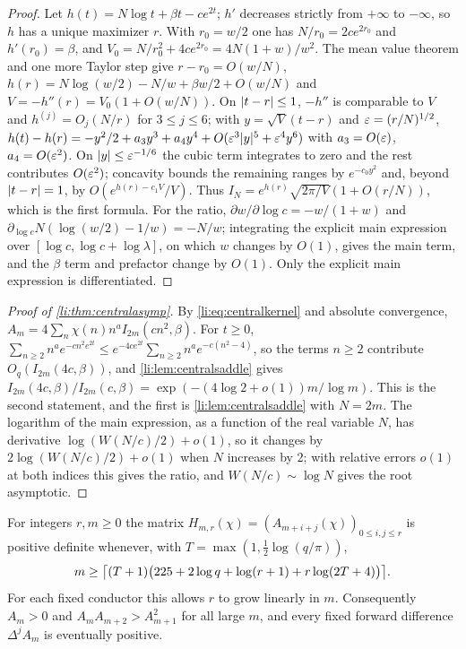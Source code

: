 \begin{proof}
Let $h(t)=N\log t+\beta t-ce^{2t}$; $h'$ decreases strictly from $+\infty$ to $-\infty$, so $h$ has a unique
maximizer $r$. With $r_0=w/2$ one has $N/r_0=2ce^{2r_0}$ and $h'(r_0)=\beta$, and
$V_0=N/r_0^2+4ce^{2r_0}=4N(1+w)/w^2$. The mean value theorem and one more Taylor step give
$r-r_0=O(w/N)$, $h(r)=N\log(w/2)-N/w+\beta w/2+O(w/N)$ and $V=-h''(r)=V_0(1+O(w/N))$. On $\abs{t-r}\le1$,
$-h''$ is comparable to $V$ and $h^{(j)}=O_j(N/r)$ for $3\le j\le6$; with $y=\sqrt V(t-r)$ and
$\eps=(r/N)^{1/2}$, $h(t)-h(r)=-y^2/2+a_3y^3+a_4y^4+O(\eps^3\abs y^5+\eps^4y^6)$ with $a_3=O(\eps)$,
$a_4=O(\eps^2)$. On $\abs y\le\eps^{-1/6}$ the cubic term integrates to zero and the rest contributes
$O(\eps^2)$; concavity bounds the remaining ranges by $e^{-c_0y^2}$ and, beyond $\abs{t-r}=1$, by
$O(e^{h(r)-c_1V}/V)$. Thus $I_N=e^{h(r)}\sqrt{2\pi/V}(1+O(r/N))$, which is the first formula. For the ratio,
$\partial w/\partial\log c=-w/(1+w)$ and $\partial_{\log c}N(\log(w/2)-1/w)=-N/w$; integrating the
explicit main expression over $[\log c,\log c+\log\lambda]$, on which $w$ changes by $O(1)$, gives the
main term, and the $\beta$ term and prefactor change by $O(1)$. Only the explicit main expression is
differentiated.
\end{proof}

\begin{proof}[Proof of \cref{li:thm:centralasymp}]
By \eqref{li:eq:centralkernel} and absolute convergence, $A_m=4\sum_n\chi(n)n^aI_{2m}(cn^2,\beta)$. For $t\ge0$,
$\sum_{n\ge2}n^ae^{-cn^2e^{2t}}\le e^{-4ce^{2t}}\sum_{n\ge2}n^ae^{-c(n^2-4)}$, so the terms $n\ge2$ contribute
$O_q(I_{2m}(4c,\beta))$, and \cref{li:lem:centralsaddle} gives
$I_{2m}(4c,\beta)/I_{2m}(c,\beta)=\exp(-(4\log2+o(1))m/\log m)$. This is the second statement, and the
first is \cref{li:lem:centralsaddle} with $N=2m$. The logarithm of the main expression, as a function of
the real variable $N$, has derivative $\log(W(N/c)/2)+o(1)$, so it changes by $2\log(W(N/c)/2)+o(1)$ when
$N$ increases by $2$; with relative errors $o(1)$ at both indices this gives the ratio, and
$W(N/c)\sim\log N$ gives the root asymptotic.
\end{proof}

\begin{theorem}\label{li:thm:centralhankel}
For integers $r,m\ge0$ the matrix $H_{m,r}(\chi)=(A_{m+i+j}(\chi))_{0\le i,j\le r}$ is positive
definite whenever, with $T=\max(1,\frac12\log(q/\pi))$,
\[
 m\ge\ceil[\big]{(T+1)\bigl(225+2\log q+\log(r+1)+r\log(2T+4)\bigr)}.
\]
For each fixed conductor this allows $r$ to grow linearly in $m$. Consequently $A_m>0$ and
$A_mA_{m+2}>A_{m+1}^2$ for all large $m$, and every fixed forward difference $\Delta^jA_m$ is eventually
positive.
\end{theorem}

